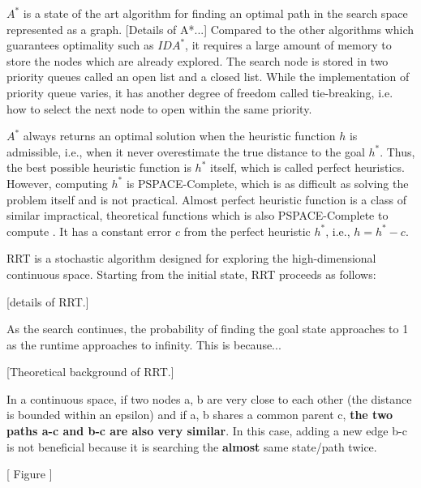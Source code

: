 

$A^*$ is a state of the art algorithm for finding an optimal path in the
search space represented as a graph. [Details of A*...] Compared to the other algorithms which
guarantees optimality such as $IDA^*$, it requires a large amount of memory
to store the nodes which are already explored. The search node is stored in
two priority queues called an open list and a closed list. While the
implementation of priority queue varies, it has another degree of freedom
called tie-breaking, i.e. how to select the next node to open within the
same priority.


$A^*$ always returns an optimal solution when the heuristic function $h$ is
admissible, i.e., when it never overestimate the true distance to the goal
$h^*$. Thus, the best possible heuristic function is $h^*$ itself, which is
called perfect heuristics. However, computing $h^*$ is PSPACE-Complete,
which is as difficult as solving the problem itself and is not
practical. Almost perfect heuristic function is a class of similar
impractical, theoretical functions which is also PSPACE-Complete to compute \cite{helmert2008good}.
It has a constant error $c$ from the perfect heuristic $h^*$, i.e., $h=h^*-c$.


RRT is a stochastic algorithm designed for exploring the high-dimensional continuous space.
Starting from the initial state, RRT proceeds as follows:

[details of RRT.]

As the search continues, the probability of finding the goal state approaches to 1 as the runtime approaches to infinity. This is because...

[Theoretical background of RRT.]

In a continuous space,
if two nodes a, b are very close to each other (the distance is bounded within an epsilon)
and if a, b shares a common parent c,
\textbf{the two paths a-c and b-c are also very similar}.
In this case, adding a new edge b-c is
not beneficial because it is searching the \textbf{almost} same state/path twice.

[ Figure ]

